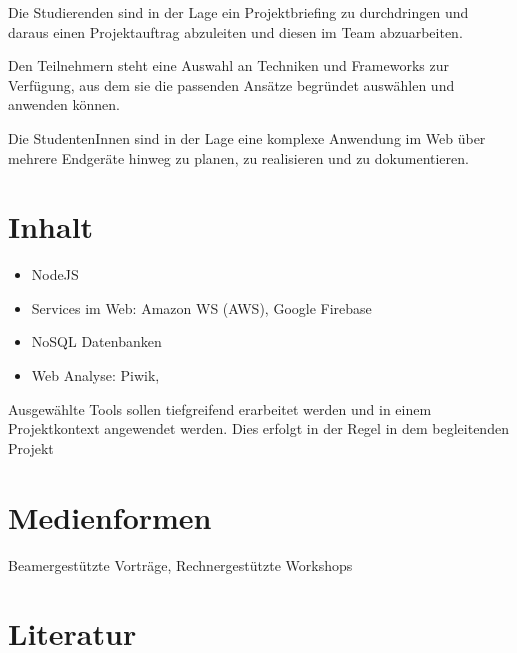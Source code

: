 Die Studierenden sind in der Lage ein Projektbriefing zu durchdringen
und daraus einen Projektauftrag abzuleiten und diesen im Team
abzuarbeiten.

Den Teilnehmern steht eine Auswahl an Techniken und Frameworks zur
Verfügung, aus dem sie die passenden Ansätze begründet auswählen und
anwenden können.

Die StudentenInnen sind in der Lage eine komplexe Anwendung im Web über
mehrere Endgeräte hinweg zu planen, zu realisieren und zu dokumentieren.

\hypertarget{inhaltpathlabelmi-2017modulbeschreibungen-bachelorba_wd_frameworks-daten-und-dienste}{%
\section*{Inhalt\label{/mi-2017/modulbeschreibungen-bachelor/BA_WD_Frameworks-daten-und-dienste}}\label{inhaltpathlabelmi-2017modulbeschreibungen-bachelorba_wd_frameworks-daten-und-dienste}}

\begin{itemize}
\tightlist
\item
  NodeJS
\item
  Services im Web: Amazon WS (AWS), Google Firebase
\item
  NoSQL Datenbanken
\item
  Web Analyse: Piwik,
\end{itemize}

Ausgewählte Tools sollen tiefgreifend erarbeitet werden und in einem
Projektkontext angewendet werden. Dies erfolgt in der Regel in dem
begleitenden Projekt

\hypertarget{medienformenpathlabelmi-2017modulbeschreibungen-bachelorba_wd_frameworks-daten-und-dienste}{%
\section*{Medienformen\label{/mi-2017/modulbeschreibungen-bachelor/BA_WD_Frameworks-daten-und-dienste}}\label{medienformenpathlabelmi-2017modulbeschreibungen-bachelorba_wd_frameworks-daten-und-dienste}}

Beamergestützte Vorträge, Rechnergestützte Workshops

\hypertarget{literaturpathlabelmi-2017modulbeschreibungen-bachelorba_wd_frameworks-daten-und-dienste}{%
\section*{Literatur\label{/mi-2017/modulbeschreibungen-bachelor/BA_WD_Frameworks-daten-und-dienste}}\label{literaturpathlabelmi-2017modulbeschreibungen-bachelorba_wd_frameworks-daten-und-dienste}}

